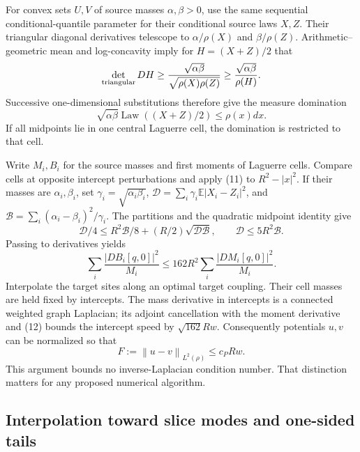 \documentclass[11pt]{article}
\newcommand{\norm}[1]{\left\lVert#1\right\rVert}
\begin{document}
For convex sets $U,V$ of source masses $\alpha,\beta>0$, use the same sequential conditional-quantile parameter for their conditional source laws $X,Z$. Their triangular diagonal derivatives telescope to $\alpha/\rho(X)$ and $\beta/\rho(Z)$. Arithmetic--geometric mean and log-concavity imply for $H=(X+Z)/2$ that
\[
\det_{\rm triangular}DH
\ge\frac{\sqrt{\alpha\beta}}{\sqrt{\rho(X)\rho(Z)}}
\ge\frac{\sqrt{\alpha\beta}}{\rho(H)}.
\]
Successive one-dimensional substitutions therefore give the measure domination
\[
\sqrt{\alpha\beta}\operatorname{Law}((X+Z)/2)\le\rho(x)dx.\tag{11}
\]
If all midpoints lie in one central Laguerre cell, the domination is restricted to that cell.

Write $M_i,B_i$ for the source masses and first moments of Laguerre cells. Compare cells at opposite intercept perturbations and apply (11) to $R^2-|x|^2$. If their masses are $\alpha_i,\beta_i$, set $\gamma_i=\sqrt{\alpha_i\beta_i}$,
$\mathcal D=\sum_i\gamma_i\mathbb E|X_i-Z_i|^2$, and
$\mathcal B=\sum_i(\alpha_i-\beta_i)^2/\gamma_i$. The partitions and the quadratic midpoint identity give
\[
\mathcal D/4\le R^2\mathcal B/8+(R/2)\sqrt{\mathcal D\mathcal B},
\qquad\mathcal D\le5R^2\mathcal B.
\]
Passing to derivatives yields
\[
\sum_i\frac{|DB_i[q,0]|^2}{M_i}
\le162R^2\sum_i\frac{|DM_i[q,0]|^2}{M_i}.\tag{12}
\]
Interpolate the target sites along an optimal target coupling. Their cell masses are held fixed by intercepts. The mass derivative in intercepts is a connected weighted graph Laplacian; its adjoint cancellation with the moment derivative and (12) bounds the intercept speed by $\sqrt{162}Rw$. Consequently potentials $u,v$ can be normalized so that
\[
F:=\norm{u-v}_{L^2(\rho)}\le c_PRw.\tag{13}
\]
This argument bounds no inverse-Laplacian condition number. That distinction matters for any proposed numerical algorithm.

\subsection{Interpolation toward slice modes and one-sided tails}
\end{document}
